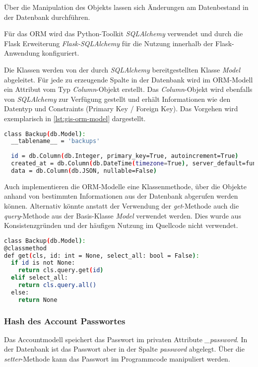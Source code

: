 Über die Manipulation des Objekts lassen sich Änderungen am Datenbestand in der Datenbank durchführen. 

Für das ORM wird das Python-Toolkit \textit{SQLAlchemy} verwendet und durch die Flask Erweiterung \textit{Flask-SQLAlchemy} für die Nutzung innerhalb der Flask-Anwendung konfiguriert. 

Die Klassen werden von der durch \textit{SQLAlchemy} bereitgestellten Klasse \textit{Model} abgeleitet. Für jede zu erzeugende Spalte in der Datenbank wird im ORM-Modell ein Attribut vom Typ \textit{Column}-Objekt erstellt. Das \textit{Column}-Objekt wird ebenfalls von \textit{SQLAlchemy} zur Verfügung gestellt und erhält Informationen wie den Datentyp und Constraints (Primary Key / Foreign Key).
Das Vorgehen wird exemplarisch in \autoref{lst:gis-orm-model} dargestellt.

\begin{lstlisting}[language=bash, frame=single, caption={GIS Beispiel eines ORM Models}, captionpos=b, label={lst:gis-orm-model}]
class Backup(db.Model):
  __tablename__ = 'backups'
  
  id = db.Column(db.Integer, primary_key=True, autoincrement=True)
  created_at = db.Column(db.DateTime(timezone=True), server_default=func.now(), nullable=False)
  data = db.Column(db.JSON, nullable=False)
\end{lstlisting}

Auch implementieren die ORM-Modelle eine Klassenmethode, über die Objekte anhand von bestimmten Informationen aus der Datenbank abgerufen werden können. Alternativ könnte anstatt der Verwendung der \textit{get}-Methode auch die \textit{query}-Methode aus der Basis-Klasse \textit{Model} verwendet werden. Dies wurde aus Konsistenzgründen und der häufigen Nutzung im Quellcode nicht verwendet.

\begin{lstlisting}[language=bash, frame=single, caption={GIS Beispiel einer Get-Methode des ORM Models}, captionpos=b, label={lst:gis-orm-model-get}]
class Backup(db.Model):
@classmethod
def get(cls, id: int = None, select_all: bool = False):
  if id is not None:
    return cls.query.get(id)
  elif select_all:
    return cls.query.all()
  else:
    return None
\end{lstlisting}

\subsubsection{Hash des Account Passwortes}
Das Accountmodell speichert das Passwort im privaten Attribute \textit{\_password}. In der Datenbank ist das Passwort aber in der Spalte \textit{password} abgelegt. Über die \textit{setter}-Methode kann das Passwort im Programmcode manipuliert werden.


